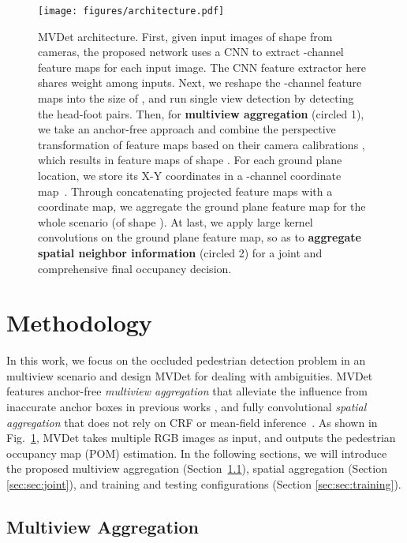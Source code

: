 \documentclass[runningheads]{llncs}
\begin{document}
\begin{figure}[t]
    \centering
    \texttt{[image: figures/architecture.pdf]}
    \caption{MVDet architecture. First, given input images of shape  from  cameras, the proposed network uses a CNN to extract -channel feature maps for each input image. The CNN feature extractor here shares weight among  inputs. Next, we reshape the -channel feature maps into the size of , and run single view detection by detecting the head-foot pairs. Then, for \textbf{multiview aggregation} (circled 1), we take an anchor-free approach and combine the perspective transformation of  feature maps based on their camera calibrations , which results in  feature maps of shape . For each ground plane location, we store its X-Y coordinates in a -channel coordinate map~\cite{liu2018intriguing}. Through concatenating  projected feature maps with a coordinate map, we aggregate the ground plane feature map for the whole scenario (of shape ). At last, we apply large kernel convolutions on the ground plane feature map, so as to \textbf{aggregate spatial neighbor information} (circled 2) for a joint and comprehensive final occupancy decision. 
    }
    \label{fig:architecture}
\end{figure}


\section{Methodology}
\label{sec:method}
In this work, we focus on the occluded pedestrian detection problem in an multiview scenario and design MVDet for dealing with ambiguities. 
MVDet features anchor-free \textit{multiview aggregation} that alleviate the influence from inaccurate anchor boxes in previous works \cite{chen2017multi,ku2018joint,chavdarova2017deep,baque2017deep}, and fully convolutional \textit{spatial aggregation} that does not rely on CRF or mean-field inference~\cite{fleuret2007multicamera,roig2011conditional,baque2017deep}. 
As shown in Fig.~\ref{fig:architecture}, MVDet takes multiple RGB images as input, and outputs the pedestrian occupancy map (POM) estimation. In the following sections, we will introduce the proposed multiview aggregation (Section~\ref{sec:sec:aggreagtion}), spatial aggregation  (Section \ref{sec:sec:joint}), and training and testing configurations (Section \ref{sec:sec:training}).


\subsection{Multiview Aggregation}
\label{sec:sec:aggreagtion}
\end{document}
